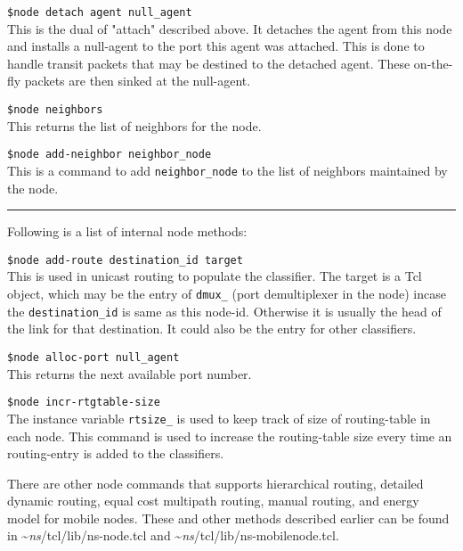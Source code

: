 \begin{flushleft}
{\tt \$node detach \<agent\> \<null\_agent\>}\\%
This is the dual of "attach" described above. It detaches the agent
from this node 
and installs a null-agent to the port this agent was attached. This is
done to handle transit packets that may be destined to the detached
agent. These on-the-fly packets are then sinked  at the null-agent.

{\tt \$node neighbors}\\%
This returns the list of neighbors for the node.

{\tt \$node add-neighbor \<neighbor\_node\>}\\%
This is a command to add {\tt \<neighbor\_node\>} to the list of neighbors 
maintained by the node.

\rule{\linewidth}{0.3mm}
Following is a list of internal node methods:

{\tt \$node add-route \<destination\_id\> \<target\>}\\%
This is used in unicast routing to populate the classifier. The target is a
Tcl object, which may be the entry of {\tt dmux\_} (port demultiplexer in
the node) incase the {\tt \<destination\_id\>} is same as this node-id.
Otherwise it is usually the head of the link for that destination. It
could also be the entry for other classifiers.

{\tt \$node alloc-port \<null\_agent\>}\\%
This returns the next available port number.

{\tt \$node incr-rtgtable-size}\\%
The instance variable {\tt rtsize\_} is used to keep track of size of
routing-table in each node. This command is used to increase the
routing-table size every time an routing-entry is added to the
classifiers.

There are other node commands that supports hierarchical
routing, detailed dynamic routing, equal cost multipath
routing, manual routing, and energy model for mobile nodes. These
and other methods described earlier can be found in 
\textasciitilde\emph{ns}/{tcl/lib/ns-node.tcl} and \textasciitilde\emph{ns}/{tcl/lib/ns-mobilenode.tcl}.

\end{flushleft}
\endinput
